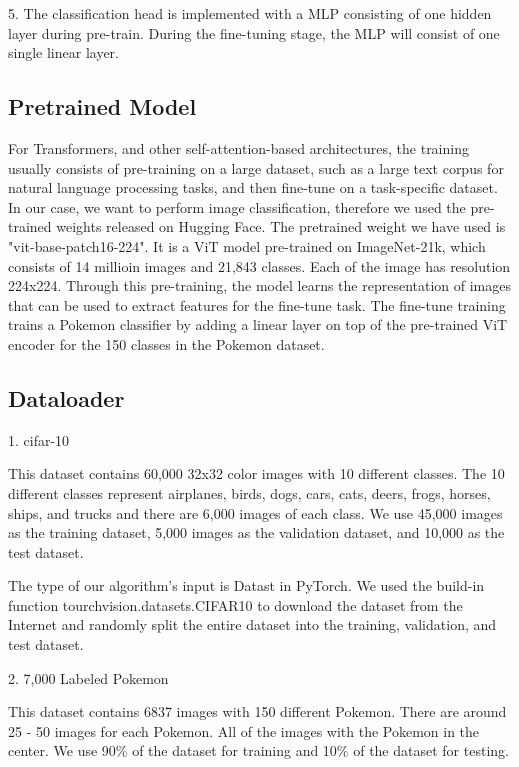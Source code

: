 \documentclass{article} %
\begin{document}
5. The classification head is implemented with a MLP consisting of one hidden layer during pre-train.
During the fine-tuning stage, the MLP will consist of one single linear layer.



\subsection{Pretrained Model}
For Transformers, and other self-attention-based architectures, the training usually consists of pre-training on 
a large dataset, such as a large text corpus for natural language processing tasks, and then fine-tune on a 
task-specific dataset. In our case, we want to perform image classification, therefore we used the pre-trained weights
released on Hugging Face. The pretrained weight we have used is "vit-base-patch16-224". It is a ViT model pre-trained
on ImageNet-21k, which consists of 14 millioin images and 21,843 classes. Each of the image has resolution 224x224.
Through this pre-training, the model learns the representation of images that can be used to extract features for the
fine-tune task. The fine-tune training trains a Pokemon classifier by adding a linear layer on top of the pre-trained
ViT encoder for the 150 classes in the Pokemon dataset.

\subsection{Dataloader} %

1. cifar-10

This dataset contains 60,000 32x32 color images with 10 different classes. The 10 different 
classes represent airplanes, birds, dogs, cars, cats, deers, frogs, horses, ships, and trucks 
and there are 6,000 images of each class. We use 45,000 images as the training dataset, 
5,000 images as the validation dataset, and 10,000 as the test dataset.

The type of our algorithm's input is Datast in PyTorch. We used the build-in function 
tourchvision.datasets.CIFAR10 to download the dataset from the Internet and randomly split 
the entire dataset into the training, validation, and test dataset. 

2. 7,000 Labeled Pokemon

This dataset contains 6837 images with 150 different Pokemon. There are around 25 - 50 
images for each Pokemon. All of the images with the Pokemon in the center. We use 90\% of 
the dataset for training and 10\% of the dataset for testing.
\end{document}
